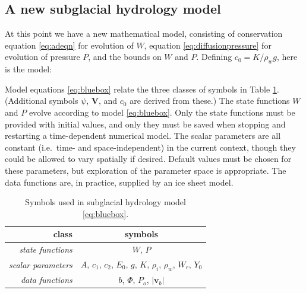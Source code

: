 \documentclass[11pt,final]{amsart}%
\newcommand*\mybluebox[1]{%
\colorbox{myblue}{\hspace{1em}#1\hspace{1em}}}
\newcommand\bv{\mathbf{v}}
\newcommand\bV{\mathbf{V}}
\newcommand{\Div}{\nabla\cdot}
\newcommand{\grad}{\nabla}
\begin{document}
\subsection*{A new subglacial hydrology model}  At this point we have a new mathematical model, consisting of conservation equation \eqref{eq:adeqn} for evolution of $W$, equation \eqref{eq:diffusionpressure} for evolution of pressure $P$, and the bounds on $W$ and $P$.  Defining $c_0 = K / \rho_w g$, here is the model:

Model equations \eqref{eq:bluebox} relate the three classes of symbols in Table \ref{tab:symbols}.  (Additional symbols $\psi$, $\bV$, and $c_0$ are derived from these.)  The state functions $W$ and $P$ evolve according to model \eqref{eq:bluebox}.  Only the state functions must be provided with initial values, and only they must be saved when stopping and restarting a time-dependent numerical model.  The scalar parameters are all constant (i.e.~time- and space-independent) in the current context, though they could be allowed to vary spatially if desired.
Default values must be chosen for these parameters, but exploration of the parameter space is appropriate.  The data functions are, in practice, supplied by an ice sheet model.  

\begin{table}[ht]
\caption{Symbols used in subglacial hydrology model \eqref{eq:bluebox}.}
\begin{tabular}{r|c}
class & symbols \\ \hline
\emph{state functions} & $W$, $P$ \\
\emph{scalar parameters} & $A$, $c_1$, $c_2$, $E_0$, $g$, $K$, $\rho_i$, $\rho_w$, $W_r$, $Y_0$ \\
\emph{data functions} & $b$, $\Phi$, $P_o$, $|\bv_b|$ \\
\hline
\end{tabular}
\label{tab:symbols}
\end{table}
\end{document}
